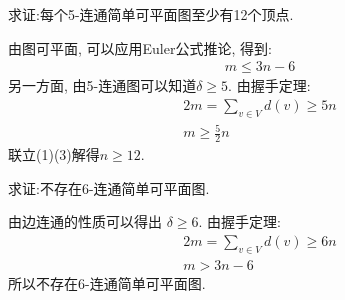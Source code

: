 \begin{problem}
    求证:每个5-连通简单可平面图至少有12个顶点.
\begin{answer}
    由图可平面, 可以应用Euler公式推论, 得到:
    \begin{gather}
        m \le 3n-6
    \end{gather}
    另一方面, 由5-连通图可以知道\(\delta \ge 5\).
    由握手定理:
    \begin{gather}
        2m = \sum_{v \in V}d(v) \ge 5n \\
        m \ge \frac{5}{2}n
    \end{gather}
    联立(1)(3)解得\(n \ge 12\).
\end{answer}
\end{problem}

\begin{problem}
    求证:不存在6-连通简单可平面图.
\begin{answer}
    由边连通的性质可以得出 \(\delta \ge 6\).
    由握手定理:
    \begin{gather}
        2m = \sum_{v \in V}d(v) \ge 6n \\
        m > 3n - 6
    \end{gather}
    所以不存在6-连通简单可平面图.
\end{answer}
\end{problem}
